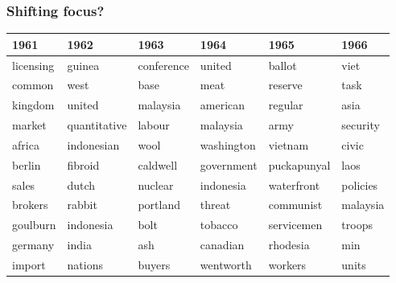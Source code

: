 \documentclass{beamer}       %
\begin{document}
\begin{frame}
\frametitle{Shifting focus?}
\begin{table}[h!]
\tiny
\begin{tabular}{llllll}

\toprule
\textbf{1961}            & \textbf{1962}          & \textbf{1963}        & \textbf{1964}       & \textbf{1965}          & \textbf{1966}         \\ \midrule
licensing       & \cellcolor{blue!25}guinea        & conference  & united     & \cellcolor{gray!25}ballot        & \cellcolor{blue!25}viet          \\
common          & west          & base        & \cellcolor{red!25}meat       & \cellcolor{orange!25}reserve       & task          \\
kingdom         & united        & \cellcolor{blue!25}malaysia    & \cellcolor{blue!25}american   & regular       & \cellcolor{blue!25}asia          \\
\cellcolor{orange!25}market          & quantitative  & labour      & \cellcolor{blue!25}malaysia   & \cellcolor{green!25}army          & security      \\
\cellcolor{blue!25}africa          & \cellcolor{blue!25}indonesian    & \cellcolor{red!25}wool        & \cellcolor{blue!25}washington & \cellcolor{blue!25}vietnam       & civic         \\
\cellcolor{blue!25}berlin          & \cellcolor{yellow!25}fibroid       & caldwell    & government & \cellcolor{green!25}puckapunyal   & \cellcolor{blue!25}laos          \\
\cellcolor{orange!25}sales           & dutch         & nuclear     & \cellcolor{blue!25}indonesia  & waterfront    & \cellcolor{gray!25}policies      \\
\cellcolor{orange!25}brokers         & \cellcolor{red!25}rabbit        & portland    & threat     & \cellcolor{blue!25}communist     & \cellcolor{blue!25}malaysia      \\
\cellcolor{yellow!25}goulburn        & \cellcolor{blue!25}indonesia     & bolt        & \cellcolor{red!25}tobacco    & \cellcolor{green!25}servicemen    & \cellcolor{green!25}troops        \\
\cellcolor{blue!25}germany         & \cellcolor{blue!25}india         & ash         & \cellcolor{blue!25}canadian   & \cellcolor{blue!25}rhodesia      & min           \\
import          & nations       & buyers      & wentworth  & \cellcolor{red!25}workers       & \cellcolor{green!25}units         \\

\end{tabular}
\end{table}
\end{frame}
\end{document}
